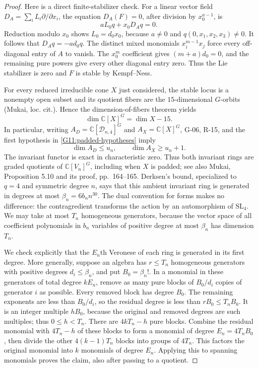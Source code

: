 \documentclass[11pt,a4paper]{article}
\theoremstyle{definition}\newtheorem{definition}{Definition}
\begin{document}
\begin{proof}
Here is a direct finite-stabilizer check. For a linear vector
field $D_A=\sum_i L_i\partial/\partial x_i$, the equation
$D_A(F)=0$, after division by $x_0^{a-1}$, is
\[
 aL_0q+x_0D_Aq=0.
\]
Reduction modulo $x_0$ shows $L_0=d_0x_0$, because $a\ne0$
and $q(0,x_1,x_2,x_3)\ne0$. It follows that
$D_Aq=-ad_0q$. The distinct mixed monomials
$x_i^{m-1}x_j$ force every off-diagonal entry of $A$ to
vanish. The $x_0^m$ coefficient gives $(m+a)d_0=0$,
and the remaining pure powers give every other diagonal
entry zero. Thus the Lie stabilizer is zero and $F$ is
stable by Kempf--Ness.

For every reduced irreducible cone $X$ just considered,
the stable locus is a nonempty open subset and its quotient
fibers are the $15$-dimensional $G$-orbits (Mukai, loc. cit.).
Hence the dimension-of-fibers theorem yields
\begin{equation}\label{G11:quotient-dimension}
 \dim\mathbb C[X]^G=\dim X-15.
\end{equation}
In particular, writing $A_D=\mathbb C[\mathcal D_{n,4}]^G$
and $A_X=\mathbb C[X]^G$, G-06, R-15, and the first
hypothesis in \eqref{G11:padded-hypotheses} imply
\[
 \dim A_D\leq u_n,\qquad \dim A_X\geq u_n+1.
\]
The invariant functor is exact in characteristic zero.
Thus both invariant rings are graded quotients of
$\mathbb C[V_n]^G$, including when $X$ is padded; see also
Mukai, Proposition 5.10 and its proof, pp.~164--165.
Derksen's bound, specialized to $q=4$ and symmetric degree
$n$, says that this ambient invariant ring is generated in
degrees at most $\beta_n=6b_n n^{30}$. The dual convention
for forms makes no difference: the contragredient
transforms the action by an automorphism of $\mathrm{SL}_4$.
We may take at most $T_n$ homogeneous generators, because
the vector space of all coefficient polynomials in $b_n$
variables of positive degree at most $\beta_n$ has dimension
$T_n$.

We check explicitly that the $E_n$th Veronese of each ring
is generated in its first degree. More generally, suppose
an algebra has $r\leq T_n$ homogeneous generators with
positive degrees $d_i\leq\beta_n$, and put
$B_0=\beta_n!$. In a monomial in these generators of total
degree $kE_n$, remove as many pure blocks of
$B_0/d_i$ copies of generator $i$ as possible. Every removed
block has degree $B_0$. The remaining exponents are less
than $B_0/d_i$, so the residual degree is less than
$rB_0\leq T_n B_0$. It is an integer multiple $hB_0$,
because the original and removed degrees are such multiples;
thus $0\leq h<T_n$. There are $4kT_n-h$ pure blocks.
Combine the residual monomial with $4T_n-h$ of these blocks
to form a monomial of degree $E_n=4T_nB_0$, then divide
the other $4(k-1)T_n$ blocks into groups of $4T_n$.
This factors the original monomial into $k$ monomials of
degree $E_n$. Applying this to spanning monomials proves
the claim, also after passing to a quotient.


\end{proof}
\end{document}
